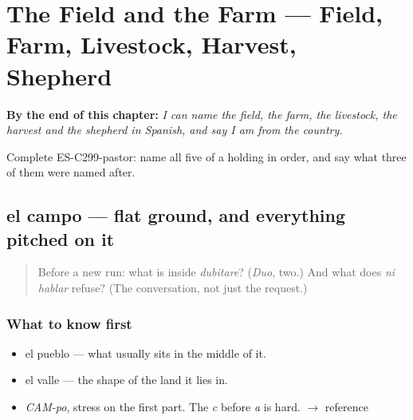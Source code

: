 
\chapter{The Field and the Farm --- Field, Farm, Livestock, Harvest, Shepherd}
\label{ch:la-granja}

\begin{chapteropening}
\textbf{By the end of this chapter:} \emph{I can name the field, the farm, the livestock, the harvest and the shepherd in Spanish, and say I am from the country.}

Complete ES-C299-pastor: name all five of a holding in order, and say what three of them were named after.
\end{chapteropening}

\section[el campo]{el campo — flat ground, and everything pitched on it}

\label{lesson:ES-C299-campo}



\begin{quote}
Before a new run: what is inside \emph{dubitare}? (\emph{Duo}, two.) And what does \emph{ni hablar} refuse? (The conversation, not just the request.)
\end{quote}

\subsection*{What to know first}
\begin{itemize}
\raggedright
  \item el pueblo — what usually sits in the middle of it.
  \item el valle — the shape of the land it lies in.
\end{itemize}

\begin{sounds}
\begin{itemize}
\raggedright
  \item \emph{CAM-po}, stress on the first part. The \emph{c} before \emph{a} is hard. $\to$ reference
\end{itemize}
\end{sounds}

